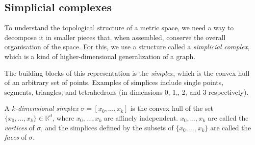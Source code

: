 \documentclass[a4paper,11pt,openany,extrafontsizes]{memoir}
\begin{document}
\subsection{Simplicial complexes}%
\label{sec:simplicial-complexes}

To understand the topological structure of a metric space, we need a
way to decompose it in smaller pieces that, when assembled, conserve
the overall organisation of the space. For this, we use a structure
called a \emph{simplicial complex}, which is a kind of
higher-dimensional generalization of a graph.

The building blocks of this representation is the \emph{simplex},
which is the convex hull of an arbitrary set of points. Examples of
simplices include single points, segments, triangles, and tetrahedrons
(in dimensions 0, 1,, 2, and 3 respectively).

\begin{defn}[Simplex]
  A \emph{$k$-dimensional simplex} $\sigma = [x_0,\ldots,x_k]$ is the
  convex hull of the set $\{x_0,\ldots,x_k\} \in \mathbb{R}^d$, where
  $x_0,\ldots,x_k$ are affinely independent. $x_0,\ldots,x_k$ are
  called the \emph{vertices} of $\sigma$, and the simplices defined by
  the subsets of $\{x_0,\ldots,x_k\}$ are called the \emph{faces} of
  $\sigma$.
\end{defn}
\end{document}
